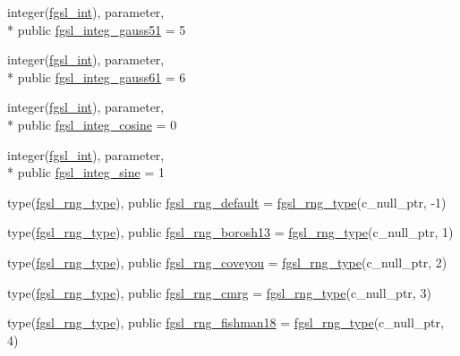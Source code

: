 \begin{DoxyCompactItemize}
\item 
integer(\hyperlink{classfgsl_a222deda1d7a0c0e845ce4a683318efeb}{fgsl\-\_\-int}), parameter, \\*
public \hyperlink{classfgsl_a8331538c5a42b13f0893e34864bae6d7}{fgsl\-\_\-integ\-\_\-gauss51} = 5
\item 
integer(\hyperlink{classfgsl_a222deda1d7a0c0e845ce4a683318efeb}{fgsl\-\_\-int}), parameter, \\*
public \hyperlink{classfgsl_ac82cf20c4bb7b1f3a6053020016abfed}{fgsl\-\_\-integ\-\_\-gauss61} = 6
\item 
integer(\hyperlink{classfgsl_a222deda1d7a0c0e845ce4a683318efeb}{fgsl\-\_\-int}), parameter, \\*
public \hyperlink{classfgsl_a32ea398e71abe5dd44ef510e11dcfa87}{fgsl\-\_\-integ\-\_\-cosine} = 0
\item 
integer(\hyperlink{classfgsl_a222deda1d7a0c0e845ce4a683318efeb}{fgsl\-\_\-int}), parameter, \\*
public \hyperlink{classfgsl_a4cc7312b9db6359e7b0cdc32f98ce88d}{fgsl\-\_\-integ\-\_\-sine} = 1
\item 
type(\hyperlink{structfgsl_1_1fgsl__rng__type}{fgsl\-\_\-rng\-\_\-type}), public \hyperlink{classfgsl_ab8c31f8079ad3a768a528cd525c8ccf2}{fgsl\-\_\-rng\-\_\-default} = \hyperlink{structfgsl_1_1fgsl__rng__type}{fgsl\-\_\-rng\-\_\-type}(c\-\_\-null\-\_\-ptr, -\/1)
\item 
type(\hyperlink{structfgsl_1_1fgsl__rng__type}{fgsl\-\_\-rng\-\_\-type}), public \hyperlink{classfgsl_afcf3a859944205f1a11e0dc35e13e608}{fgsl\-\_\-rng\-\_\-borosh13} = \hyperlink{structfgsl_1_1fgsl__rng__type}{fgsl\-\_\-rng\-\_\-type}(c\-\_\-null\-\_\-ptr, 1)
\item 
type(\hyperlink{structfgsl_1_1fgsl__rng__type}{fgsl\-\_\-rng\-\_\-type}), public \hyperlink{classfgsl_a8eb316ba1f0e42680fb05bf4444f3018}{fgsl\-\_\-rng\-\_\-coveyou} = \hyperlink{structfgsl_1_1fgsl__rng__type}{fgsl\-\_\-rng\-\_\-type}(c\-\_\-null\-\_\-ptr, 2)
\item 
type(\hyperlink{structfgsl_1_1fgsl__rng__type}{fgsl\-\_\-rng\-\_\-type}), public \hyperlink{classfgsl_a46ec4ab895207c6e3da1a2adb29bb0ff}{fgsl\-\_\-rng\-\_\-cmrg} = \hyperlink{structfgsl_1_1fgsl__rng__type}{fgsl\-\_\-rng\-\_\-type}(c\-\_\-null\-\_\-ptr, 3)
\item 
type(\hyperlink{structfgsl_1_1fgsl__rng__type}{fgsl\-\_\-rng\-\_\-type}), public \hyperlink{classfgsl_a8f22f1b0b7e5d37d485553834c96b959}{fgsl\-\_\-rng\-\_\-fishman18} = \hyperlink{structfgsl_1_1fgsl__rng__type}{fgsl\-\_\-rng\-\_\-type}(c\-\_\-null\-\_\-ptr, 4)

\end{DoxyCompactItemize}
